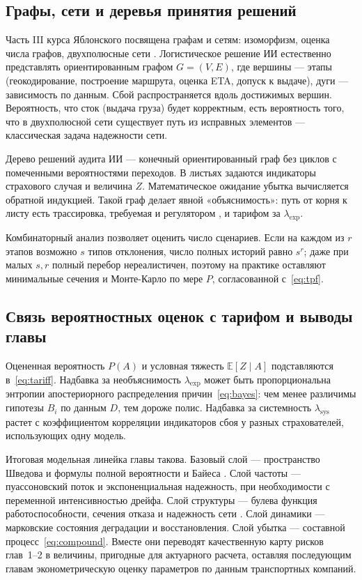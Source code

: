 \documentclass[a4paper,14pt]{extarticle}
\begin{document}
\subsection{Графы, сети и деревья принятия решений}

Часть III курса Яблонского посвящена графам и сетям: изоморфизм, оценка числа графов, двухполюсные сети \cite{yablonsky}. Логистическое решение ИИ естественно представлять ориентированным графом $G=(V,E)$, где вершины --- этапы (геокодирование, построение маршрута, оценка ETA, допуск к выдаче), дуги --- зависимость по данным. Сбой распространяется вдоль достижимых вершин. Вероятность, что сток (выдача груза) будет корректным, есть вероятность того, что в двухполюсной сети существует путь из исправных элементов --- классическая задача надежности сети.

Дерево решений аудита ИИ --- конечный ориентированный граф без циклов с помеченными вероятностями переходов. В листьях задаются индикаторы страхового случая и величина $Z$. Математическое ожидание убытка вычисляется обратной индукцией. Такой граф делает явной «объяснимость»: путь от корня к листу есть трассировка, требуемая и регулятором \cite{cbr}, и тарифом за $\lambda_{\mathrm{exp}}$.

Комбинаторный анализ \cite{yablonsky} позволяет оценить число сценариев. Если на каждом из $r$ этапов возможно $s$ типов отклонения, число полных историй равно $s^r$; даже при малых $s,r$ полный перебор нереалистичен, поэтому на практике оставляют минимальные сечения и Монте-Карло по мере $P$, согласованной с~\eqref{eq:tpf}.

\subsection{Связь вероятностных оценок с тарифом и выводы главы}

Оцененная вероятность $P(A)$ и условная тяжесть $\mathbb{E}[Z\mid A]$ подставляются в~\eqref{eq:tariff}. Надбавка за необъяснимость $\lambda_{\mathrm{exp}}$ может быть пропорциональна энтропии апостериорного распределения причин~\eqref{eq:bayes}: чем менее различимы гипотезы $B_i$ по данным $D$, тем дороже полис. Надбавка за системность $\lambda_{\mathrm{sys}}$ растет с коэффициентом корреляции индикаторов сбоя у разных страхователей, использующих одну модель.

Итоговая модельная линейка главы такова. Базовый слой --- пространство Шведова и формулы полной вероятности и Байеса \cite{shvedov}. Слой частоты --- пуассоновский поток и экспоненциальная надежность, при необходимости с переменной интенсивностью дрейфа. Слой структуры --- булева функция работоспособности, сечения отказа и надежность сети \cite{yablonsky}. Слой динамики --- марковские состояния деградации и восстановления. Слой убытка --- составной процесс~\eqref{eq:compound}. Вместе они переводят качественную карту рисков глав~1--2 в величины, пригодные для актуарного расчета, оставляя последующим главам эконометрическую оценку параметров по данным транспортных компаний.
\end{document}
